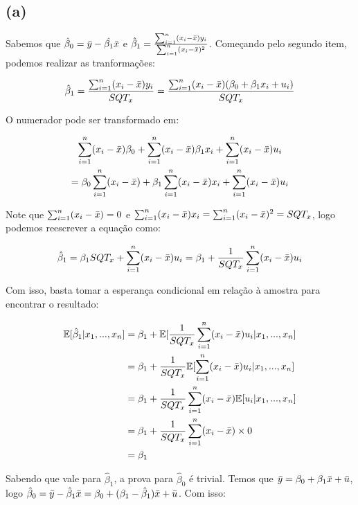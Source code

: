 \documentclass[12pt]{article}
\begin{document}
\subsection*{(a)}
Sabemos que $\hat{\beta}_0=\Bar{y}-\hat{\beta_1}\Bar{x}$ e $\hat{\beta}_1=\frac{\sum_{i=1}^n(x_i-\Bar{x})y_i}{\sum_{i=1}^n(x_i-\Bar{x})^2}$. Começando pelo segundo item, podemos realizar as tranformações:

\begin{equation*}
    \hat{\beta}_1=\frac{\sum_{i=1}^n(x_i-\Bar{x})y_i}{SQT_x}=\frac{\sum_{i=1}^n(x_i-\Bar{x})(\beta_0+\beta_1x_i+u_i)}{SQT_x}
\end{equation*}

O numerador pode ser transformado em:

\begin{equation*}
    \begin{gathered}
        \sum_{i=1}^n(x_i-\Bar{x})\beta_0+\sum_{i=1}^n(x_i-\Bar{x})\beta_1x_i+\sum_{i=1}^n(x_i-\Bar{x})u_i\\
        =\beta_0\sum_{i=1}^n(x_i-\Bar{x})+\beta_1\sum_{i=1}^n(x_i-\Bar{x})x_i+\sum_{i=1}^n(x_i-\Bar{x})u_i
    \end{gathered}
\end{equation*}

Note que $\sum_{i=1}^n(x_i-\Bar{x})=0$ e $\sum_{i=1}^n(x_i-\Bar{x})x_i=\sum_{i=1}^n(x_i-\Bar{x})^2=SQT_x$, logo podemos reescrever a equação como:

\begin{equation*}
    \hat{\beta}_1=\beta_1SQT_x+\sum_{i=1}^n(x_i-\Bar{x})u_i=\beta_1+\frac{1}{SQT_x}\sum_{i=1}^n(x_i-\Bar{x})u_i
\end{equation*}

Com isso, basta tomar a esperança condicional em relação à amostra para encontrar o resultado:

\begin{align*}
    \mathbb{E}[\hat{\beta}_1|x_1,...,x_n]&=\beta_1+\mathbb{E}[\frac{1}{SQT_x}\sum_{i=1}^n(x_i-\Bar{x})u_i|x_1,...,x_n]\\
    &=\beta_1+\frac{1}{SQT_x}\mathbb{E}[\sum_{i=1}^n(x_i-\Bar{x})u_i|x_1,...,x_n]\\
    &=\beta_1+\frac{1}{SQT_x}\sum_{i=1}^n(x_i-\Bar{x})\mathbb{E}[u_i|x_1,...,x_n]\\
    &=\beta_1+\frac{1}{SQT_x}\sum_{i=1}^n(x_i-\Bar{x})\times0\\
    &=\beta_1
\end{align*}

Sabendo que vale para $\hat{\beta}_1$, a prova para $\hat{\beta}_0$ é trivial. Temos que $\Bar{y}=\beta_0+\beta_1\Bar{x}+\Bar{u}$, logo $\hat{\beta}_0=\Bar{y}-\hat{\beta}_1\Bar{x}=\beta_0+(\beta_1-\hat{\beta}_1)\Bar{x}+\Bar{u}$. Com isso:
\end{document}
